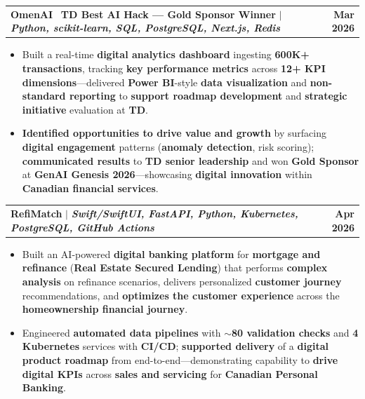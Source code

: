 \documentclass[letterpaper,10pt]{article}
\makeatletter
\newcommand{\resumeItem}[1]{
  \item\small{
    {#1 \vspace{-1pt}}
  }
}
\newcommand{\resumeProjectHeading}[2]{
    \item
    \begin{tabular*}{1.001\textwidth}{l@{\extracolsep{\fill}}r}
      \small#1 & \textbf{\small #2}\\
    \end{tabular*}\vspace{-9pt}
}
\newcommand{\resumeItemListStart}{\begin{itemize}[leftmargin=0.15in]}
\newcommand{\resumeItemListEnd}{\end{itemize}\vspace{-4pt}}
\makeatother
\begin{document}
    \resumeProjectHeading
          {\textbf{OmenAI} \textbar\ \textbf{TD Best AI Hack --- Gold Sponsor Winner} $|$ \emph{\textbf{Python, scikit-learn, SQL, PostgreSQL, Next.js, Redis}}}{Mar 2026}
    \resumeItemListStart
    \resumeItem{Built a real-time \textbf{digital analytics dashboard} ingesting \textbf{600K+ transactions}, tracking \textbf{key performance metrics} across \textbf{12+ KPI dimensions}---delivered \textbf{Power BI}-style \textbf{data visualization} and \textbf{non-standard reporting} to \textbf{support roadmap development} and \textbf{strategic initiative} evaluation at \textbf{TD}.}
    \vspace{-2pt}
    \resumeItem{\textbf{Identified opportunities to drive value and growth} by surfacing \textbf{digital engagement} patterns (\textbf{anomaly detection}, risk scoring); \textbf{communicated results} to \textbf{TD senior leadership} and won \textbf{Gold Sponsor} at \textbf{GenAI Genesis 2026}---showcasing \textbf{digital innovation} within \textbf{Canadian financial services}.}
          \resumeItemListEnd 
          \vspace{-18pt}

      \resumeProjectHeading
          {\textbf{RefiMatch} $|$ \emph{\textbf{Swift/SwiftUI, FastAPI, Python, Kubernetes, PostgreSQL, GitHub Actions}}}{Apr 2026}
          \resumeItemListStart
            \resumeItem{Built an AI-powered \textbf{digital banking platform} for \textbf{mortgage and refinance} (\textbf{Real Estate Secured Lending}) that performs \textbf{complex analysis} on refinance scenarios, delivers personalized \textbf{customer journey} recommendations, and \textbf{optimizes the customer experience} across the \textbf{homeownership financial journey}.}
            \vspace{-2pt}
            \resumeItem{Engineered \textbf{automated data pipelines} with \textbf{$\sim$80 validation checks} and \textbf{4 Kubernetes} services with \textbf{CI/CD}; \textbf{supported delivery} of a \textbf{digital product roadmap} from end-to-end---demonstrating capability to \textbf{drive digital KPIs} across \textbf{sales and servicing} for \textbf{Canadian Personal Banking}.}
          \resumeItemListEnd
          \vspace{-18pt}
\end{document}
